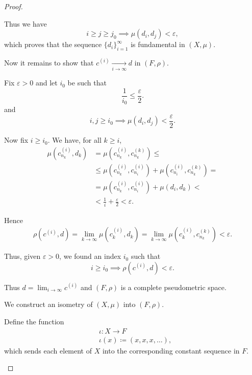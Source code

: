 \begin{proof}
\begin{defenum}
    Thus we have
    \begin{equation*}
      i \geq j \geq j_0 \implies \mu(d_i, d_j) < \varepsilon,
    \end{equation*}
    which proves that the sequence \( \{ d_i \}_{i=1}^\infty \) is fundamental in \( (X, \mu) \).

    Now it remains to show that \( c^{(i)} \xrightarrow[i \to \infty]{} d \) in \( (F, \rho) \).

    Fix \( \varepsilon > 0 \) and let \( i_0 \) be such that
    \begin{equation*}
      \frac 1 {i_0} \leq \frac \varepsilon 2.
    \end{equation*}
    and
    \begin{equation*}
      i, j \geq i_0 \implies \mu(d_i, d_j) < \frac \varepsilon 2.
    \end{equation*}

    Now fix \( i \geq i_0 \). We have, for all \( k \geq i \),
    \begin{align*}
      \mu(c_{n_k}^{(i)}, d_k)
      &=
      \mu(c_{n_k}^{(i)}, c_{n_k}^{(k)})
      \leq \\ &\leq
      \mu(c_{n_k}^{(i)}, c_{n_i}^{(i)}) + \mu(c_{n_i}^{(i)}, c_{n_k}^{(k)})
      = \\ &=
      \mu(c_{n_k}^{(i)}, c_{n_i}^{(i)}) + \mu(d_i, d_k)
      < \\ &<
      \frac 1 i + \frac \varepsilon 2
      <
      \varepsilon.
    \end{align*}

    Hence
    \begin{align*}
      \rho(c^{(i)}, d)
      =
      \lim_{k \to \infty} \mu(c_k^{(i)}, d_k)
      =
      \lim_{k \to \infty} \mu(c_k^{(i)}, c_{n_k}^{(k)})
      <
      \varepsilon.
    \end{align*}

    Thus, given \( \varepsilon > 0 \), we found an index \( i_0 \) such that
    \begin{equation*}
      i \geq i_0 \implies \rho(c^{(i)}, d) < \varepsilon.
    \end{equation*}

    Thus \( d = \lim_{i \to \infty} c^{(i)} \) and \( (F, \rho) \) is a complete pseudometric space.

     We construct an isometry of \( (X, \mu) \) into \( (F, \rho) \).

    Define the function
    \begin{align*}
      &\iota: X \to F \\
      &\iota(x) \coloneqq (x, x, x, \ldots),
    \end{align*}
    which sends each element of \( X \) into the corresponding constant sequence in \( F \).


\end{defenum}
\end{proof}
